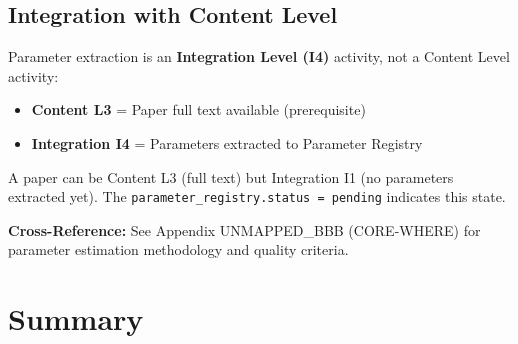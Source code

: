 \subsection{Integration with Content Level}

Parameter extraction is an \textbf{Integration Level (I4)} activity, not a Content Level activity:

\begin{itemize}[nosep]
    \item \textbf{Content L3} = Paper full text available (prerequisite)
    \item \textbf{Integration I4} = Parameters extracted to Parameter Registry
\end{itemize}

A paper can be Content L3 (full text) but Integration I1 (no parameters extracted yet).
The \texttt{parameter\_registry.status = pending} indicates this state.

\textbf{Cross-Reference:} See Appendix UNMAPPED_BBB (CORE-WHERE) for parameter estimation
methodology and quality criteria.


\section{Summary}
\label{sec:paperint-summary}

